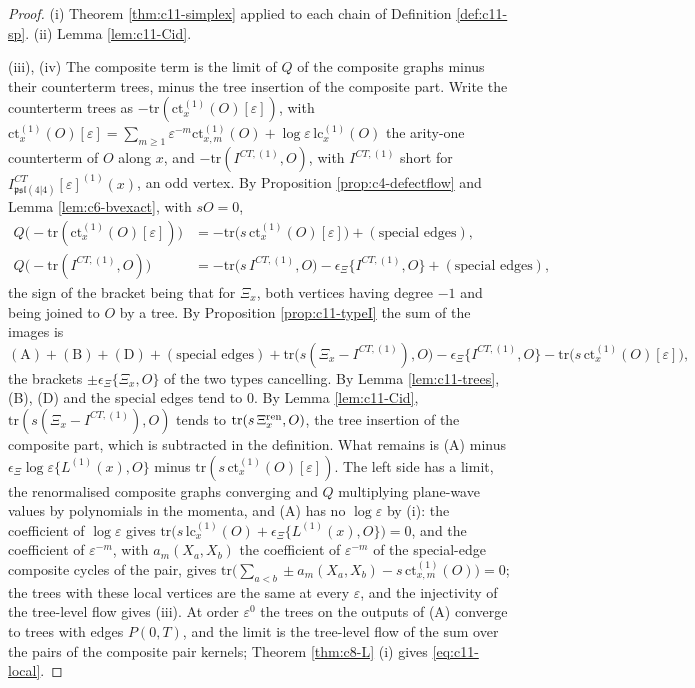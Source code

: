 \begin{proof}
(i) Theorem \ref{thm:c11-simplex} applied to each chain of Definition \ref{def:c11-sp}. (ii) Lemma \ref{lem:c11-Cid}.

(iii), (iv) The composite term is the limit of $Q$ of the composite graphs minus their counterterm trees, minus the tree insertion of the composite part. Write the counterterm trees as $-\mathrm{tr}(\mathrm{ct}^{(1)}_x(O)[\varepsilon])$, with $\mathrm{ct}^{(1)}_x(O)[\varepsilon]=\sum_{m\ge1}\varepsilon^{-m}\mathrm{ct}^{(1)}_{x,m}(O)+\log\varepsilon\,\mathrm{lc}^{(1)}_x(O)$ the arity-one counterterm of $O$ along $x$, and $-\mathrm{tr}(I^{CT,(1)},O)$, with $I^{CT,(1)}$ short for $I^{CT}_{\mathfrak{psl}(4|4)}[\varepsilon]^{(1)}(x)$, an odd vertex. By Proposition \ref{prop:c4-defectflow} and Lemma \ref{lem:c6-bvexact}, with $sO=0$,
\[
\begin{aligned}
Q\big(-\mathrm{tr}(\mathrm{ct}^{(1)}_x(O)[\varepsilon])\big)&=-\mathrm{tr}\big(s\,\mathrm{ct}^{(1)}_x(O)[\varepsilon]\big)+(\text{special edges}),\\
Q\big(-\mathrm{tr}(I^{CT,(1)},O)\big)&=-\mathrm{tr}\big(s\,I^{CT,(1)},O\big)-\epsilon_\Xi\{I^{CT,(1)},O\}+(\text{special edges}),
\end{aligned}
\]
the sign of the bracket being that for $\Xi_x$, both vertices having degree $-1$ and being joined to $O$ by a tree. By Proposition \ref{prop:c11-typeI} the sum of the images is
\[
(\mathrm A)+(\mathrm B)+(\mathrm D)+(\text{special edges})+\mathrm{tr}\big(s(\Xi_x-I^{CT,(1)}),O\big)-\epsilon_\Xi\{I^{CT,(1)},O\}-\mathrm{tr}\big(s\,\mathrm{ct}^{(1)}_x(O)[\varepsilon]\big),
\]
the brackets $\pm\epsilon_\Xi\{\Xi_x,O\}$ of the two types cancelling. By Lemma \ref{lem:c11-trees}, (B), (D) and the special edges tend to $0$. By Lemma \ref{lem:c11-Cid}, $\mathrm{tr}(s(\Xi_x-I^{CT,(1)}),O)$ tends to $\mathrm{tr}(s\,\Xi^{\rm ren}_x,O)$, the tree insertion of the composite part, which is subtracted in the definition. What remains is (A) minus $\epsilon_\Xi\log\varepsilon\{L^{(1)}(x),O\}$ minus $\mathrm{tr}(s\,\mathrm{ct}^{(1)}_x(O)[\varepsilon])$. The left side has a limit, the renormalised composite graphs converging and $Q$ multiplying plane-wave values by polynomials in the momenta, and (A) has no $\log\varepsilon$ by (i): the coefficient of $\log\varepsilon$ gives $\mathrm{tr}\big(s\,\mathrm{lc}^{(1)}_x(O)+\epsilon_\Xi\{L^{(1)}(x),O\}\big)=0$, and the coefficient of $\varepsilon^{-m}$, with $a_m(X_a,X_b)$ the coefficient of $\varepsilon^{-m}$ of the special-edge composite cycles of the pair, gives $\mathrm{tr}\big(\sum_{a<b}\pm a_m(X_a,X_b)-s\,\mathrm{ct}^{(1)}_{x,m}(O)\big)=0$; the trees with these local vertices are the same at every $\varepsilon$, and the injectivity of the tree-level flow gives (iii). At order $\varepsilon^0$ the trees on the outputs of (A) converge to trees with edges $P(0,T)$, and the limit is the tree-level flow of the sum over the pairs of the composite pair kernels; Theorem \ref{thm:c8-L} (i) gives \eqref{eq:c11-local}.


\end{proof}
